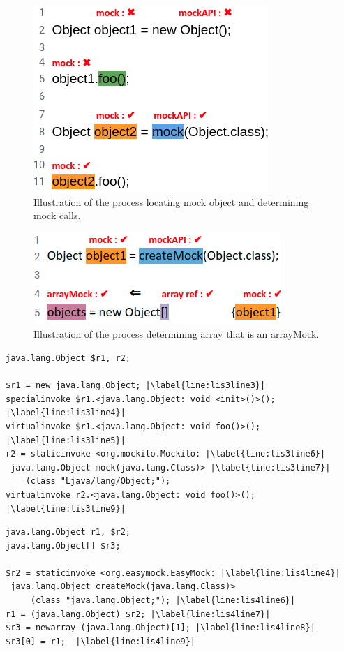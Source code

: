 \begin{figure}
    \includegraphics[width=.25\textwidth]{Images/mockInvocationIllustration.png}
    
    \caption{Illustration of the process locating mock object and determining mock calls.}
    \label{fig:mockMethodIllustration}
    
\end{figure}

\begin{figure}
    \includegraphics[width=.25\textwidth]{Images/arrayMockIllustration.png}
    
    \caption{Illustration of the process determining array that is an arrayMock.}
    \label{fig:arrayMockIllustration}
    
\end{figure}

\begin{lstlisting}[basicstyle=\ttfamily, caption={Jimple Intermediate Representation for the code in Figure~\ref{fig:mockMethodIllustration}.},
basicstyle=\scriptsize\ttfamily, framesep=4.5mm, framexleftmargin=1.0mm, captionpos=b, label=lis:mockMethodIllustrationIR, escapechar=|]
java.lang.Object $r1, r2;

$r1 = new java.lang.Object; |\label{line:lis3line3}|
specialinvoke $r1.<java.lang.Object: void <init>()>(); |\label{line:lis3line4}|
virtualinvoke $r1.<java.lang.Object: void foo()>(); |\label{line:lis3line5}|
r2 = staticinvoke <org.mockito.Mockito: |\label{line:lis3line6}|
 java.lang.Object mock(java.lang.Class)> |\label{line:lis3line7}|
 	(class "Ljava/lang/Object;");
virtualinvoke r2.<java.lang.Object: void foo()>(); |\label{line:lis3line9}|
\end{lstlisting}

\begin{lstlisting}[basicstyle=\ttfamily, caption={Jimple Intermediate Representation for the array in Figure~\ref{fig:arrayMockIllustration}.},
basicstyle=\scriptsize\ttfamily, framesep=4.5mm, framexleftmargin=1.0mm, captionpos=b, label=lis:arrayIllustrationIR, escapechar=|]
java.lang.Object r1, $r2;
java.lang.Object[] $r3;

$r2 = staticinvoke <org.easymock.EasyMock: |\label{line:lis4line4}|
 java.lang.Object createMock(java.lang.Class)>
     (class "java.lang.Object;"); |\label{line:lis4line6}|
r1 = (java.lang.Object) $r2; |\label{line:lis4line7}|
$r3 = newarray (java.lang.Object)[1]; |\label{line:lis4line8}|
$r3[0] = r1;  |\label{line:lis4line9}|
\end{lstlisting}
